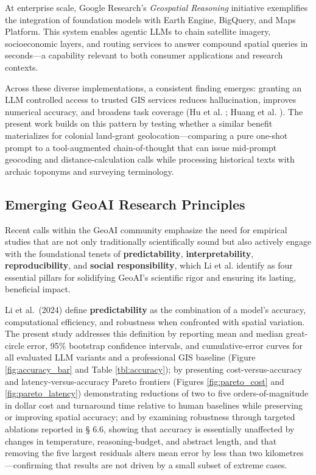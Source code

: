 At enterprise scale, Google Research's \emph{Geospatial Reasoning}
initiative \citep{GoogleResearch2025_geospatial} exemplifies the
integration of foundation models with Earth Engine, BigQuery, and Maps
Platform. This system enables agentic LLMs to chain satellite imagery,
socioeconomic layers, and routing services to answer compound spatial
queries in seconds---a capability relevant to both consumer applications
and research contexts.

Across these diverse implementations, a consistent finding emerges:
granting an LLM controlled access to trusted GIS services reduces
hallucination, improves numerical accuracy, and broadens task coverage
(Hu et al. \citep{Hu2024_toponym_llm}; Huang et al.
\citep{Huang2024_geoagent}). The present work builds on this pattern by
testing whether a similar benefit materializes for colonial land-grant
geolocation---comparing a pure one-shot prompt to a tool-augmented
chain-of-thought that can issue mid-prompt geocoding and
distance-calculation calls while processing historical texts with
archaic toponyms and surveying terminology.

\subsection{Emerging GeoAI Research
Principles}\label{emerging-geoai-research-principles}

Recent calls within the GeoAI community emphasize the need for empirical
studies that are not only traditionally scientifically sound but also
actively engage with the foundational tenets of \textbf{predictability},
\textbf{interpretability}, \textbf{reproducibility}, and \textbf{social
responsibility}, which Li et al. \citep{Li2024_geoai} identify as four
essential pillars for solidifying GeoAI's scientific rigor and ensuring
its lasting, beneficial impact.

Li et al.~(2024) define \textbf{predictability} as the combination of a
model's accuracy, computational efficiency, and robustness when
confronted with spatial variation. The present study addresses this
definition by reporting mean and median great-circle error, 95\%
bootstrap confidence intervals, and cumulative-error curves for all
evaluated LLM variants and a professional GIS baseline (Figure
\ref{fig:accuracy_bar} and Table \ref{tbl:accuracy}); by presenting
cost-versus-accuracy and latency-versus-accuracy Pareto frontiers
(Figures \ref{fig:pareto_cost} and \ref{fig:pareto_latency})
demonstrating reductions of two to five orders-of-magnitude in dollar
cost and turnaround time relative to human baselines while preserving or
improving spatial accuracy; and by examining robustness through targeted
ablations reported in § 6.6, showing that accuracy is essentially
unaffected by changes in temperature, reasoning-budget, and abstract
length, and that removing the five largest residuals alters mean error
by less than two kilometres---confirming that results are not driven by
a small subset of extreme cases.


